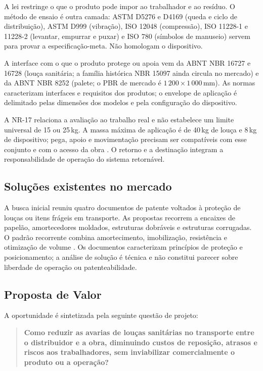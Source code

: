 A lei restringe o que o produto pode impor ao trabalhador e ao resíduo. O método de ensaio é outra camada: ASTM D5276 e D4169 (queda e ciclo de distribuição), ASTM D999 (vibração), ISO 12048 (compressão), ISO 11228-1 e 11228-2 (levantar, empurrar e puxar) e ISO 780 (símbolos de manuseio) servem para provar a especificação-meta. Não homologam o dispositivo.

A interface com o que o produto protege ou apoia vem da ABNT NBR 16727 e 16728 (louça sanitária; a família histórica NBR 15097 ainda circula no mercado) e da ABNT NBR 8252 (palete; o PBR de mercado é $1\,200 \times 1\,000$\,mm). As normas caracterizam interfaces e requisitos dos produtos; o envelope de aplicação é delimitado pelas dimensões dos modelos e pela configuração do dispositivo.

A NR-17 relaciona a avaliação ao trabalho real e não estabelece um limite universal de 15 ou 25\,kg. A massa máxima de aplicação é de 40\,kg de louça e 8\,kg de dispositivo; pega, apoio e movimentação precisam ser compatíveis com esse conjunto e com o acesso da obra \citep{nr17oficial,nr18oficial}. O retorno e a destinação integram a responsabilidade de operação do sistema retornável.

\subsection{Soluções existentes no mercado}

A busca inicial reuniu quatro documentos de patente voltados à proteção de louças ou itens frágeis em transporte. As propostas recorrem a encaixes de papelão, amortecedores moldados, estruturas dobráveis e estruturas corrugadas. O padrão recorrente combina amortecimento, imobilização, resistência e otimização de volume \citep{us2015,jp2007,cn2022,us2019}. Os documentos caracterizam princípios de proteção e posicionamento; a análise de solução é técnica e não constitui parecer sobre liberdade de operação ou patenteabilidade.

\subsection{Proposta de Valor}

A oportunidade é sintetizada pela seguinte questão de projeto:

\begin{quote}
\bfseries
Como reduzir as avarias de louças sanitárias no transporte entre o distribuidor e a obra, diminuindo custos de reposição, atrasos e riscos aos trabalhadores, sem inviabilizar comercialmente o produto ou a operação?
\end{quote}

